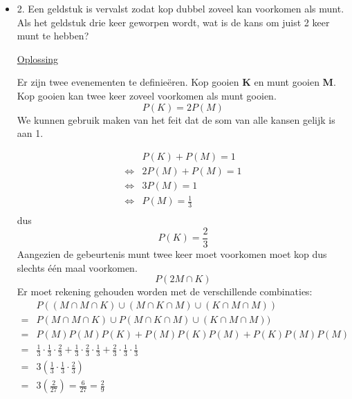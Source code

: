 \documentclass[12pt]{report}
\newcommand{\exercise}[2]{
  #1
  

  \underline{Oplossing}
  
  #2
  
    \hrulefill
}
\begin{document}
\begin{itemize}[label={}, leftmargin=*]
	\item {\exercise{2. Een geldstuk is vervalst zodat kop dubbel zoveel kan voorkomen als munt. Als het geldstuk drie keer geworpen wordt, wat is de kans om juist 2 keer munt te hebben?}{
		Er zijn twee evenementen te definieëren. Kop gooien \textbf{K} en munt gooien \textbf{M}. Kop gooien kan twee keer zoveel voorkomen als munt gooien.
		$$P(K) = 2P(M)$$
		We kunnen gebruik maken van het feit dat de som van alle kansen gelijk is aan 1.
		
		
		\begin{equation*}
			\begin{split}
				&  P(K) + P(M) = 1    \\
				\Leftrightarrow & 2P(M) + P(M) = 1    \\
				\Leftrightarrow & 3P(M) = 1           \\
				\Leftrightarrow & P(M) = \frac{1}{3}  \\
			\end{split}
		\end{equation*}
		dus
		$$P(K) = \frac{2}{3}$$
		Aangezien de gebeurtenis munt twee keer moet voorkomen moet kop dus slechts één maal voorkomen.
		$$P(2M \cap K)$$
		Er moet rekening gehouden worden met de verschillende combinaties:
		\begin{equation*}
			\begin{split}
				& P((M \cap M \cap K) \cup (M \cap K \cap M) \cup (K \cap M \cap M))  \\
				= & P(M \cap M \cap K) \cup P(M \cap K \cap M) \cup (K \cap M \cap M)) \\
				= & P(M)P(M)P(K) + P(M)P(K)P(M) + P(K)P(M)P(M) \\
				= & \frac{1}{3} \cdot \frac{1}{3} \cdot \frac{2}{3} + \frac{1}{3} \cdot \frac{2}{3} \cdot \frac{1}{3} + \frac{2}{3} \cdot \frac{1}{3} \cdot \frac{1}{3} \\
				= & 3(\frac{1}{3} \cdot \frac{1}{3} \cdot \frac{2}{3}) \\
				= & 3(\frac{2}{27}) = \frac{6}{27} = \frac{2}{9} 
			\end{split}
		\end{equation*}
	}}
	    

\end{itemize}
\end{document}

